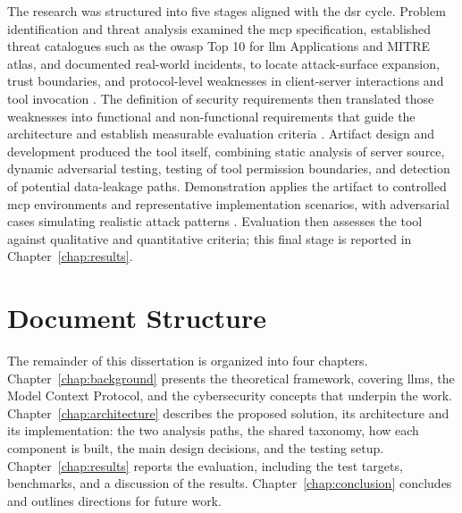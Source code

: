The research was structured into five stages aligned with the \gls{dsr} cycle. Problem identification and threat analysis examined the \gls{mcp} specification, established threat catalogues such as the \gls{owasp} Top 10 for \gls{llm} Applications and MITRE \gls{atlas}, and documented real-world incidents, to locate attack-surface expansion, trust boundaries, and protocol-level weaknesses in client-server interactions and tool invocation \citep{qi2025protocol}. The definition of security requirements then translated those weaknesses into functional and non-functional requirements that guide the architecture and establish measurable evaluation criteria \citep{nist2022ssdf, nist2020zerotrust}. Artifact design and development produced the tool itself, combining static analysis of server source, dynamic adversarial testing, testing of tool permission boundaries, and detection of potential data-leakage paths. Demonstration applies the artifact to controlled \gls{mcp} environments and representative implementation scenarios, with adversarial cases simulating realistic attack patterns \citep{greshake2023prompt, owasp2024llm01}. Evaluation then assesses the tool against qualitative and quantitative criteria; this final stage is reported in Chapter~\ref{chap:results}.

\section{Document Structure}
\label{sec:structure}

The remainder of this dissertation is organized into four chapters. Chapter~\ref{chap:background} presents the theoretical framework, covering \glspl{llm}, the Model Context Protocol, and the cybersecurity concepts that underpin the work. Chapter~\ref{chap:architecture} describes the proposed solution, its architecture and its implementation: the two analysis paths, the shared taxonomy, how each component is built, the main design decisions, and the testing setup. Chapter~\ref{chap:results} reports the evaluation, including the test targets, benchmarks, and a discussion of the results. Chapter~\ref{chap:conclusion} concludes and outlines directions for future work.
